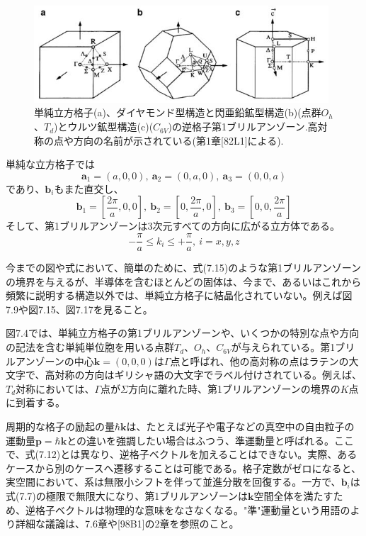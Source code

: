 \documentclass[11pt,a4j,uplatex]{jsarticle}
\begin{document}
\begin{figure}[tb]
 \centering
 \includegraphics[clip,width=11cm]{7_4.JPG}
 \caption{単純立方格子(a)、ダイヤモンド型構造と閃亜鉛鉱型構造(b)(点群$O_h$、$T_d$)とウルツ鉱型構造(c)($C_{6V}$)の逆格子第1ブリルアンゾーン.高対称の点や方向の名前が示されている(第1章[82L1]による).}
 \label{7.4}
\end{figure}

単純な立方格子では
\begin{equation}
  \bm{a}_1=(a,0,0),\ \bm{a}_2=(0,a,0),\ \bm{a}_3=(0,0,a)\tag{7.13}
\end{equation}
であり、$\bm{b}_i$もまた直交し、
\begin{equation}
  \bm{b}_1=[\frac{2\pi}{a},0,0],\ \bm{b}_2=[0,\frac{2\pi}{a},0],\ \bm{b}_3=[0,0,\frac{2\pi}{a}]\tag{7.14}
\end{equation}
そして、第1ブリルアンゾーンは3次元すべての方向に広がる立方体である。
\begin{equation}
  -\frac{\pi}{a}\leq k_i\leq+\frac{\pi}{a},\ i=x,y,z\tag{7.15}
\end{equation}

今までの図や式において、簡単のために、式(7.15)のような第1ブリルアンゾーンの境界を与えるが、半導体を含むほとんどの固体は、今まで、あるいはこれから頻繁に説明する構造以外では、単純立方格子に結晶化されていない。例えば図7.9や図7.15、図7.17を見ること。

図7.4では、単純立方格子の第1ブリルアンゾーンや、いくつかの特別な点や方向の記法を含む単純単位胞を用いる点群$T_d$、$O_h$、$C_{6V}$が与えられている。第1ブリルアンゾーンの中心$\bm{k}=(0,0,0)$は$\Gamma$点と呼ばれ、他の高対称の点はラテンの大文字で、高対称の方向はギリシャ語の大文字でラベル付けされている。例えば、$T_d$対称においては、$\Gamma$点が$\Sigma$方向に離れた時、第1ブリルアンゾーンの境界の$K$点に到着する。

周期的な格子の励起の量$\hbar\bm{k}$は、たとえば光子や電子などの真空中の自由粒子の運動量$\bm{p}=\hbar\bm{k}$との違いを強調したい場合はふつう、準運動量と呼ばれる。ここで、式(7.12)とは異なり、逆格子ベクトルを加えることはできない。実際、あるケースから別のケースへ遷移することは可能である。格子定数がゼロになると、実空間において、系は無限小シフトを伴って並進分散を回復する。一方で、$\bm{b}_i$は式(7.7)の極限で無限大になり、第1ブリルアンゾーンは$\bm{k}$空間全体を満たすため、逆格子ベクトルは物理的な意味をなさなくなる。"準"運動量という用語のより詳細な議論は、7.6章や[98B1]の2章を参照のこと。
\end{document}
